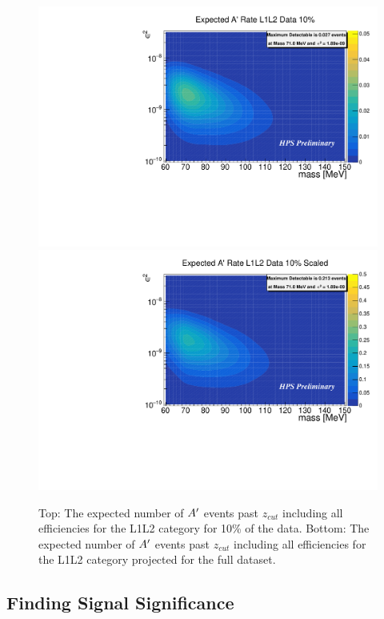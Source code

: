 \begin{figure}[t]
    \centering
    \includegraphics[width=.85\textwidth]{figs/Results/ap_rate_L1L2.pdf}
    \includegraphics[width=.85\textwidth]{figs/Results/ap_rate_L1L2_scaled.pdf}
    \caption{Top: The expected number of $A^\prime$ events past $z_{cut}$ including all efficiencies for the L1L2 category for 10\% of the data. Bottom: The expected number of $A^\prime$ events past $z_{cut}$ including all efficiencies for the L1L2 category projected for the full dataset.}
    \label{fig:sigyield_L1L2}
\end{figure}

\clearpage

\subsection{Finding Signal Significance}\label{sec:apsig}

